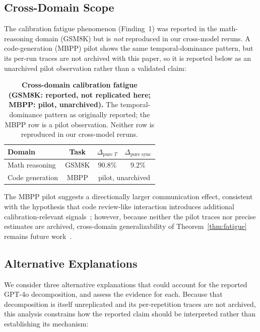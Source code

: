 \documentclass[11pt]{article}
\theoremstyle{definition}
\theoremstyle{remark}
\begin{document}
\subsection{Cross-Domain Scope}

The calibration fatigue phenomenon (Finding~1) was reported in the math-reasoning domain (GSM8K) but is \emph{not} reproduced in our cross-model reruns. A code-generation (MBPP) pilot shows the same temporal-dominance pattern, but its per-run traces are not archived with this paper, so it is reported below as an unarchived pilot observation rather than a validated claim:

\begin{table}[H]
\centering
\caption{\textbf{Cross-domain calibration fatigue (GSM8K: reported, not replicated here; MBPP: pilot, unarchived).} The temporal-dominance pattern as originally reported; the MBPP row is a pilot observation. Neither row is reproduced in our cross-model reruns.}
\begin{tabular}{@{}lccc@{}}
\toprule
Domain & Task & $\Delta_{\text{pure } T}$ & $\Delta_{\text{pure sync}}$ \\
\midrule
Math reasoning & GSM8K & 90.8\% & 9.2\% \\
Code generation & MBPP & \multicolumn{2}{c}{\footnotesize pilot, unarchived} \\
\bottomrule
\end{tabular}
\end{table}

The MBPP pilot suggests a directionally larger communication effect, consistent with the hypothesis that code review-like interaction introduces additional calibration-relevant signals~\citep{sun2020test}; however, because neither the pilot traces nor precise estimates are archived, cross-domain generalizability of Theorem~\ref{thm:fatigue} remains future work~\citep{temporal2026}.

\subsection{Alternative Explanations}

We consider three alternative explanations that could account for the reported GPT-4o decomposition, and assess the evidence for each. Because that decomposition is itself unreplicated and its per-repetition traces are not archived, this analysis constrains how the reported claim should be interpreted rather than establishing its mechanism:
\end{document}

